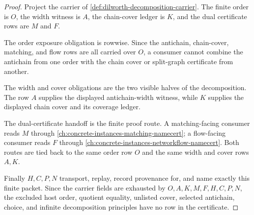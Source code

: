 \begin{proof}
Project the carrier of \autoref{def:dilworth-decomposition-carrier}. The finite order is $O$, the width witness is $A$, the chain-cover ledger is $K$, and the dual certificate rows are $M$ and $F$.

The order exposure obligation is rowwise. Since the antichain, chain-cover, matching, and flow rows are all carried over $O$, a consumer cannot combine the antichain from one order with the chain cover or split-graph certificate from another.

The width and cover obligations are the two visible halves of the decomposition. The row $A$ supplies the displayed antichain-width witness, while $K$ supplies the displayed chain cover and its coverage ledger.

The dual-certificate handoff is the finite proof route. A matching-facing consumer reads $M$ through \autoref{ch:concrete-instances-matching-namecert}; a flow-facing consumer reads $F$ through \autoref{ch:concrete-instances-networkflow-namecert}. Both routes are tied back to the same order row $O$ and the same width and cover rows $A,K$.

Finally $H,C,P,N$ transport, replay, record provenance for, and name exactly this finite packet. Since the carrier fields are exhausted by $O,A,K,M,F,H,C,P,N$, the excluded host order, quotient equality, unlisted cover, selected antichain, choice, and infinite decomposition principles have no row in the certificate.
\end{proof}

